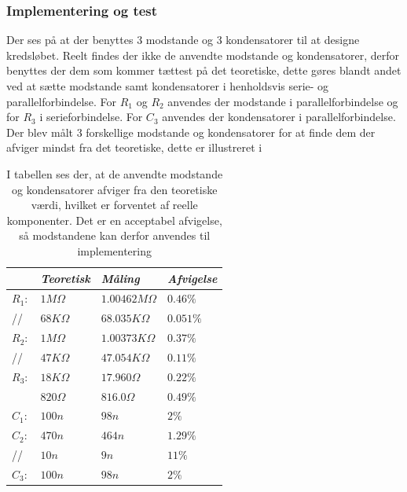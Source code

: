 \subsubsection{Implementering og test}
Der ses på  at der benyttes 3 modstande og 3 kondensatorer til at designe kredsløbet. Reelt findes der ikke de anvendte modstande og kondensatorer, derfor benyttes der dem som kommer tættest på det teoretiske, dette gøres  blandt andet ved at sætte modstande samt kondensatorer i henholdsvis serie- og parallelforbindelse. For $R_{1}$ og $R_{2}$ anvendes der modstande i parallelforbindelse og for $R_{3}$ i serieforbindelse. For $C_3$ anvendes der kondensatorer i parallelforbindelse. Der blev målt 3 forskellige modstande og kondensatorer for at finde dem der afviger mindst fra det teoretiske, dette er illustreret i 

\begin{table}[H]
	\centering
	\begin{tabular}{|l|l|l|l|}
		\hline
						& \textit{Teoretisk}			& \textit{Måling} 	&  \textit{Afvigelse} \\ \hline
	 \textbf{$R_{1}:$} 	& $1M\Omega$ 				& $1.00462M\Omega$ 		& $0.46\%$  \\ \hline
				//		& $68K\Omega$ 				& $68.035K\Omega$ 		& $0.051\%$  \\ \hline
	 \textbf{$R_{2}:$} 	& $1M\Omega$ 				& $1.00373K\Omega$		& $0.37\%$	\\ \hline
	 			//		& $47K\Omega$ 				& $47.054K\Omega$		& $0.11\%$ 	\\ \hline
	 \textbf{$R_{3}:$} 	& $18K\Omega$				& $17.960\Omega$ 		& $0.22\%$ 	\\ \hline
	 					& $820\Omega$				& $816.0\Omega$			& $0.49\%$ 	\\ \hline
	 \textbf{$C_{1}:$} 	& $100n$ 					& $98n$ 					& $2\%$      \\ \hline
	 \textbf{$C_{2}:$} 	& $470n$						& $464n$					& $1.29\%$  		\\ \hline
	 			//		& $10n$						& $9n$					& $11\%$  		\\ \hline
	\textbf{$C_{3}:$}	& $100n$ 					& $98n$ 					& $2\%$      \\ \hline
	\end{tabular}
	\caption{I tabellen ses der, at de anvendte modstande og kondensatorer afviger fra den teoretiske værdi, hvilket er forventet af reelle komponenter. Det er en acceptabel afvigelse, så modstandene kan derfor anvendes til implementering}
	\label{Tab:Maalingfilter}
\end{table}

